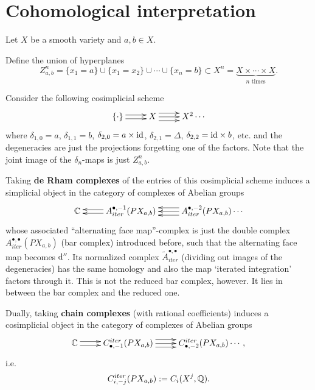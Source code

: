 

\section{Cohomological interpretation}
Let $X$ be a smooth variety and $a, b \in X$. 

\begin{defn}\label{defn:Zab}
Define the union of hyperplanes 
\[
Z_{a,b}^n = \{ x_1 = a \} \cup \{ x_1 = x_2 \} \cup \cdots \cup \{x_n = b\} \subset X^n=\underbrace{X \times \cdots \times X}_{\textrm{$n$ times}}.
\]
\end{defn}

Consider the following cosimplicial scheme
\[ \xymatrix{
 \{\cdot \} \ar@<0.5ex>[r] \ar@<-0.5ex>[r] & X \ar@<-1ex>[r] \ar[r] \ar@<+1ex>[r] & X^2 \cdots  
 }\]
 where $\delta_{1,0} = a$, $\delta_{1,1} = b$,  $\delta_{2,0} = a \times \mathrm{id}$,  $\delta_{2,1} = \Delta$,  $\delta_{2,2} = \mathrm{id} \times b$, etc. and the 
 degeneracies are just the projections forgetting one of the factors.
 Note that the joint image of the $\delta_{n}$-maps is just $Z_{a,b}^n$.
 
Taking {\bf de Rham complexes} of the entries of this cosimplicial scheme induces a simplicial object in the category of complexes of Abelian groups
\[ \xymatrix{
 \C& A^{\bullet,-1}_{iter}(PX_{a,b}) \ar@<0.5ex>[l] \ar@<-0.5ex>[l]  & A^{\bullet,-2}_{iter}(PX_{a,b}) \ar@<-1ex>[l] \ar[l] \ar@<+1ex>[l] \cdots  
 }\]
whose associated ``alternating face map''-complex is just the double complex $A^{\bullet,\bullet}_{iter}(PX_{a,b})$ (bar complex) introduced before, such that
the alternating face map becomes $\mathrm{d}''$.
Its normalized complex $\widetilde{A}^{\bullet,\bullet}_{iter}$ (dividing out images of the degeneracies) has the same homology and also the map
`iterated integration' factors through it. This is not the reduced bar complex, however. It lies in between the bar complex and the reduced one.

Dually, taking {\bf chain complexes} (with rational coefficients) induces a cosimplicial object in the category of complexes of Abelian groups
\[ \xymatrix{
 \C \ar@<0.5ex>[r] \ar@<-0.5ex>[r] & C_{\bullet,-1}^{iter}(PX_{a,b}) \ar@<-1ex>[r] \ar[r] \ar@<+1ex>[r] & C_{\bullet,-2}^{iter}(PX_{a,b}) \cdots,  
 }\]
i.e. 
\[ C_{i,-j}^{iter}(PX_{a,b}) := C_{i}(X^j, \mathbb{Q}). \] 
 
